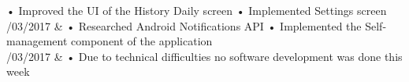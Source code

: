 \begin{longtabu}
      • Improved the UI of the History Daily screen\newline
      • Implemented Settings screen
      \\ /03/2017
      &
      • Researched Android Notifications API\newline
      • Implemented the Self-management component of the application
      \\ /03/2017
      &
      • Due to technical difficulties no software development was done this week
      \\ \hline
    \caption{Project Log}
    \label{table:project-log}
\end{longtabu}